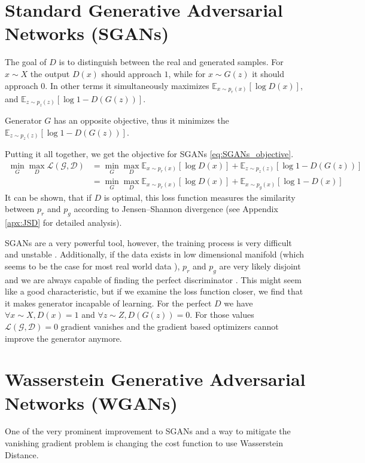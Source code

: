 \section{Standard Generative Adversarial Networks (SGANs)}
The goal of $D$ is to distinguish between the real and generated samples. For $x
\sim X$ the output $D(x)$ should approach $1$, while for $x \sim G(z)$ it should
approach $0$. In other terms it simultaneously maximizes $\mathbb{E}_{x \sim
  p_r(x)}[\log{D(x)}]$, and $\mathbb{E}_{z \sim p_z(z)}[\log{1 - D(G(z))}]$.

Generator $G$ has an opposite objective, thus it minimizes the $\mathbb{E}_{z
  \sim p_z(z)}[\log{1 - D(G(z))}]$.

Putting it all together, we get the objective for SGANs \ref{eq:SGANs_objective}.
\begin{equation}
  \label{eq:SGANs_objective}
  \begin{split}
    \min_G\max_D\mathcal{L(G, D)} & = \min_G\max_D \mathbb{E}_{x \sim p_r(x)}[\log{D(x)}] +  \mathbb{E}_{z \sim p_z(z)}[\log{1 - D(G(z))}] \\
    & = \min_G\max_D \mathbb{E}_{x \sim p_r(x)}[\log{D(x)}] +  \mathbb{E}_{x \sim p_g(x)}[\log{1 - D(x)}]
  \end{split}
\end{equation}
It can be shown, that if $D$ is optimal, this loss function measures the similarity between 
$p_r$ and $p_g$ according to Jensen–Shannon divergence (see Appendix
\ref{apx:JSD} for detailed analysis). 

SGANs are a very powerful tool, however, the training process is very difficult
and unstable \cite{salimans2016improved}. Additionally, if the data exists in
low dimensional manifold (which seems to be the case for most real world data
\cite{narayanan2010proceedings}), $p_r$ and $p_g$ are very likely disjoint and we are always capable of finding the perfect discriminator 
\cite{arjovsky2017principled}. This might seem like a good
characteristic, but if we examine the loss function closer, we find that it
makes generator incapable of learning. For the perfect $D$ we have $\forall x
\sim X, D(x) = 1$ and $\forall z \sim Z, D(G(z)) = 0$. For those values
$\mathcal{L(G,D)} = 0$ gradient vanishes and the gradient based optimizers cannot improve the
generator anymore.
\section{Wasserstein Generative Adversarial Networks (WGANs)}
One of the very prominent improvement to SGANs and a way to mitigate the
vanishing gradient problem is changing the cost function to use Wasserstein
Distance.

